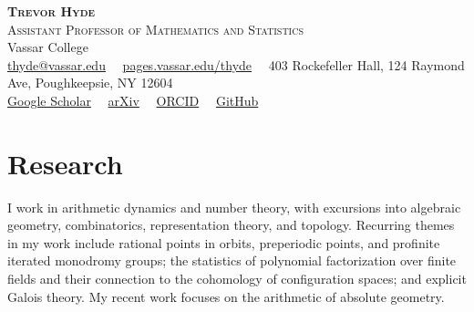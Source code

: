 \documentclass[11pt,letterpaper]{article}
\begin{document}
\begin{center}
    {\Huge\bfseries\scshape Trevor Hyde}\\[2pt]
    {\large\scshape Assistant Professor of Mathematics and Statistics}\\[2pt]
    Vassar College\\[3pt]
    \href{mailto:thyde@vassar.edu}{thyde@vassar.edu}
    \ \textperiodcentered\ \href{https://pages.vassar.edu/thyde/}{pages.vassar.edu/thyde}
    \ \textperiodcentered\ 403 Rockefeller Hall, 124 Raymond Ave, Poughkeepsie, NY 12604\\[2pt]
    \href{https://scholar.google.com/citations?user=mjTVg8UAAAAJ}{Google Scholar}
    \ \textperiodcentered\ \href{https://arxiv.org/search/?searchtype=author&query=Hyde%2C+Trevor}{arXiv}
    \ \textperiodcentered\ \href{https://orcid.org/0000-0002-9380-1928}{ORCID}
    \ \textperiodcentered\ \href{https://github.com/tghyde}{GitHub}
\end{center}

\section{Research}
I work in arithmetic dynamics and number theory, with excursions into algebraic geometry, combinatorics, representation theory, and topology.
Recurring themes in my work include rational points in orbits, preperiodic points, and profinite iterated monodromy groups; the statistics of polynomial factorization over finite fields and their connection to the cohomology of configuration spaces; and explicit Galois theory.
My recent work focuses on the arithmetic of absolute geometry.

\end{document}
